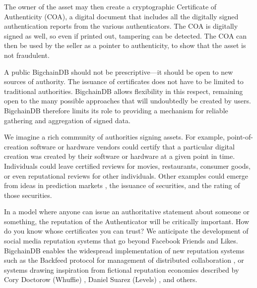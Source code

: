 The owner of the asset may then create a cryptographic Certificate of Authenticity (COA), a digital document that includes all the digitally signed authentication reports from the various authenticators.
The COA is digitally signed as well, so even if printed out, tampering can be detected.
The COA can then be used by the seller as a pointer to authenticity, to show that the asset is not fraudulent.

A public BigchainDB should not be prescriptive—it should be open to new sources of authority.
The issuance of certificates does not have to be limited to traditional authorities.
BigchainDB allows flexibility in this respect, remaining open to the many possible approaches that will undoubtedly be created by users.
BigchainDB therefore limits its role to providing a mechanism for reliable gathering and aggregation of signed data.

We imagine a rich community of authorities signing assets. 
For example, point-of-creation software or hardware vendors could certify that a particular digital creation was created by their software or hardware at a given point in time. 
Individuals could leave certified reviews for movies, restaurants, consumer goods, or even reputational reviews for other individuals.
Other examples could emerge from ideas in prediction markets \cite{hanson1993consensus}, the issuance of securities, and the rating of those securities.

In a model where anyone can issue an authoritative statement about someone or something, the reputation of the Authenticator will be critically important.
How do you know whose certificates you can trust?
We anticipate the development of social media reputation systems that go beyond Facebook Friends and Likes.
BigchainDB enables the widespread implementation of new reputation systems such as the Backfeed protocol for management of distributed collaboration \cite{backfeed}, or systems drawing inspiration from fictional reputation economies described by Cory Doctorow (Whuffie) \cite{doctorow2003down}, Daniel Suarez (Levels) \cite{suarez2010freedomtm}, and others.
